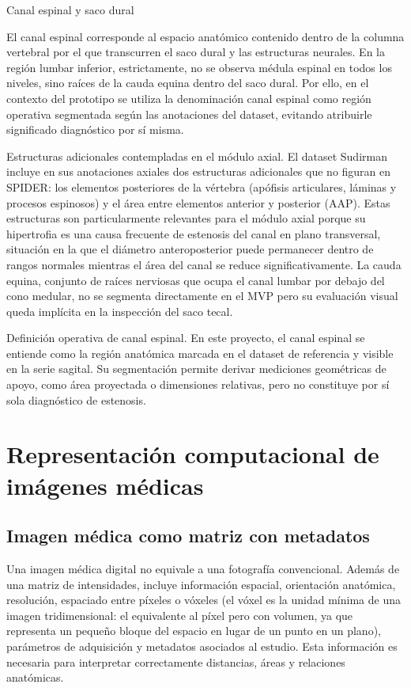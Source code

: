 Canal espinal y saco dural

El canal espinal corresponde al espacio anatómico contenido dentro de la columna vertebral por el que transcurren el saco dural y las estructuras neurales. En la región lumbar inferior, estrictamente, no se observa médula espinal en todos los niveles, sino raíces de la cauda equina dentro del saco dural. Por ello, en el contexto del prototipo se utiliza la denominación canal espinal como región operativa segmentada según las anotaciones del dataset, evitando atribuirle significado diagnóstico por sí misma.

Estructuras adicionales contempladas en el módulo axial. El dataset Sudirman incluye en sus anotaciones axiales dos estructuras adicionales que no figuran en SPIDER: los elementos posteriores de la vértebra (apófisis articulares, láminas y procesos espinosos) y el área entre elementos anterior y posterior (AAP). Estas estructuras son particularmente relevantes para el módulo axial porque su hipertrofia es una causa frecuente de estenosis del canal en plano transversal, situación en la que el diámetro anteroposterior puede permanecer dentro de rangos normales mientras el área del canal se reduce significativamente. La cauda equina, conjunto de raíces nerviosas que ocupa el canal lumbar por debajo del cono medular, no se segmenta directamente en el MVP pero su evaluación visual queda implícita en la inspección del saco tecal.

Definición operativa de canal espinal. En este proyecto, el canal espinal se entiende como la región anatómica marcada en el dataset de referencia y visible en la serie sagital. Su segmentación permite derivar mediciones geométricas de apoyo, como área proyectada o dimensiones relativas, pero no constituye por sí sola diagnóstico de estenosis.

\section{Representación computacional de imágenes médicas}

\subsection{Imagen médica como matriz con metadatos}

Una imagen médica digital no equivale a una fotografía convencional. Además de una matriz de intensidades, incluye información espacial, orientación anatómica, resolución, espaciado entre píxeles o vóxeles (el vóxel es la unidad mínima de una imagen tridimensional: el equivalente al píxel pero con volumen, ya que representa un pequeño bloque del espacio en lugar de un punto en un plano), parámetros de adquisición y metadatos asociados al estudio. Esta información es necesaria para interpretar correctamente distancias, áreas y relaciones anatómicas.

